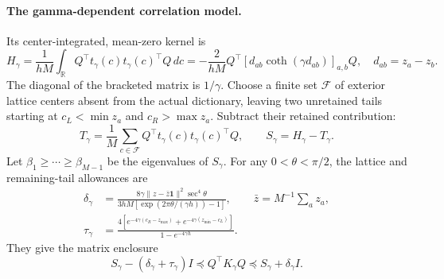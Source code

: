 \paragraph{The gamma-dependent correlation model.}
Its center-integrated, mean-zero kernel is
\begin{equation}
 H_\gamma=\frac1{hM}\int_{\mathbb R}
 Q^\top t_\gamma(c)t_\gamma(c)^\top Q\,dc
 =-\frac2{hM}Q^\top[d_{ab}\coth(\gamma d_{ab})]_{a,b}Q,
 \quad d_{ab}=z_a-z_b.
 \label{eq:note-H}
\end{equation}
The diagonal of the bracketed matrix is $1/\gamma$. Choose a finite set
$\mathcal F$ of exterior lattice centers absent from the actual dictionary,
leaving two unretained tails starting at $c_L<\min z_a$ and
$c_R>\max z_a$. Subtract their retained contribution:
\begin{equation}
 T_\gamma=\frac1M\sum_{c\in\mathcal F}
 Q^\top t_\gamma(c)t_\gamma(c)^\top Q,\qquad
 S_\gamma=H_\gamma-T_\gamma.
 \label{eq:note-S}
\end{equation}
Let $\beta_1\ge\cdots\ge\beta_{M-1}$ be the eigenvalues of $S_\gamma$.
For any $0<\theta<\pi/2$, the lattice and remaining-tail allowances are
\begin{align}
 \delta_\gamma&=
 \frac{8\gamma\|z-\bar z\mathbf1\|^2\sec^4\theta}
 {3hM[\exp(2\pi\theta/(\gamma h))-1]},\qquad
 \bar z=M^{-1}\sum_a z_a,\label{eq:note-delta}\\
 \tau_\gamma&=
 \frac{4[e^{-4\gamma(c_R-z_{\max})}
       +e^{-4\gamma(z_{\min}-c_L)}]}{1-e^{-4\gamma h}}.
 \label{eq:note-tau}
\end{align}
They give the matrix enclosure
\begin{equation}
 S_\gamma-(\delta_\gamma+\tau_\gamma)I
 \preceq Q^\top K_\gamma Q\preceq S_\gamma+\delta_\gamma I.
 \label{eq:note-matrix-enclosure}
\end{equation}

